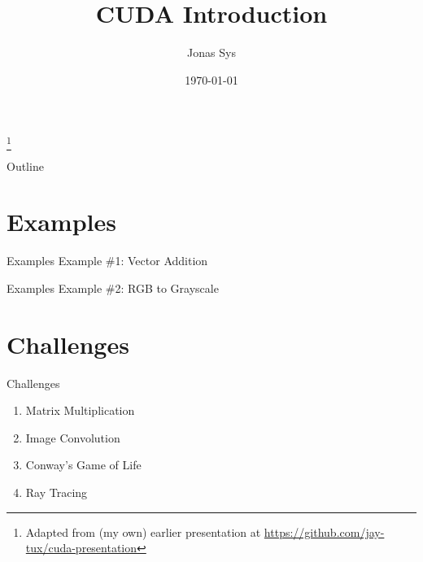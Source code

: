 \documentclass[11pt]{beamer}
\title{CUDA Introduction}
\author{Jonas Sys}
\date{\today}
\begin{document}
    

    \begin{frame}
        \titlepage
        \renewcommand{\thefootnote}{}
        \footnote[frame]{Adapted from (my own) earlier presentation at \url{https://github.com/jay-tux/cuda-presentation}}
        \renewcommand{\thefootnote}{\arabic{footnote}}
    \end{frame}

    \begin{frame}{Outline}
        \tableofcontents
    \end{frame}

    
    

    \section{Examples}\label{sec:examples}
    \mkAgenda
    \begin{frame}{Examples}
        \centering \huge
        Example \#1: Vector Addition
    \end{frame}

    \begin{frame}{Examples}
        \centering \huge
        Example \#2: RGB to Grayscale
    \end{frame}

    \section{Challenges}\label{sec:challenges}
    \mkAgenda
    \begin{frame}{Challenges}
        \begin{enumerate}
            \item Matrix Multiplication
            \item Image Convolution
            \item Conway's Game of Life
            \item Ray Tracing
        \end{enumerate}
    \end{frame}

    
\end{document}

